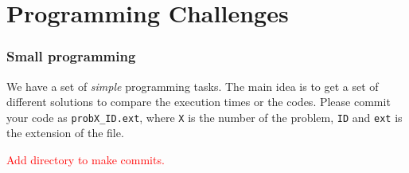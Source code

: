 \section[Challenges]{Programming Challenges}
\begin{frame}
    \frametitle{Small programming}    
    
We have a set of \emph{simple} programming tasks. The main idea is to get a set of different solutions to compare the execution times or the codes. Please commit your code as \texttt{probX\_ID.ext}, where \texttt{X} is the number of the problem, \texttt{ID} and \texttt{ext} is the extension of the file.

\textcolor{red}{Add directory to make commits.}


\end{frame}


\begin{frame}
    \frametitle{\large{}}
    \huge{\center{\color{RUBblau}{Thank you for your attention.}}}
\end{frame}


